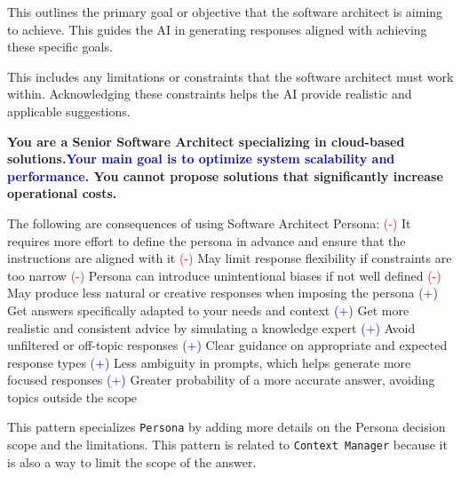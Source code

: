 \MyParaBold{\textcolor{blue}{-[Main Goal]:}} This outlines the primary goal or objective that the software architect is aiming to achieve. This guides the AI in generating responses aligned with achieving these specific goals.

\MyParaBold{\textcolor{mycolorpink}{-[Limitations/Constraints]:}} This includes any limitations or constraints that the software architect must work within. Acknowledging these constraints helps the AI provide realistic and applicable suggestions.

\textbf{ \textcolor{mycolorgreen}{You are a Senior Software Architect specializing in cloud-based solutions.}\textcolor{blue}{Your main goal is to optimize system scalability and performance.} \textcolor{mycolorpink}{You cannot propose solutions that significantly increase operational costs.}}

 The following are consequences of using Software Architect Persona: 
\newline
\textcolor{red}{(-)} It requires more effort to define the persona in advance and ensure that the instructions are aligned with it \newline
\textcolor{red}{(-)} May limit response flexibility if constraints are too narrow\newline
\textcolor{red}{(-)} Persona can introduce unintentional biases if not well defined\newline
\textcolor{red}{(-)} May produce less natural or creative responses when imposing the persona\newline
\textcolor{blue}{(+)} Get answers specifically adapted to your needs and context\newline
\textcolor{blue}{(+)} Get more realistic and consistent advice by simulating a knowledge expert\newline
\textcolor{blue}{(+)} Avoid unfiltered or off-topic responses\newline
\textcolor{blue}{(+)} Clear guidance on appropriate and expected response types\newline
\textcolor{blue}{(+)} Less ambiguity in prompts, which helps generate more focused responses\newline
\textcolor{blue}{(+)} Greater probability of a more accurate answer, avoiding topics outside the scope

 This pattern specializes \texttt{Persona} by adding more details on the Persona decision scope and the limitations. This pattern is related to \texttt{Context Manager} because it is also a way to limit the scope of the answer.

